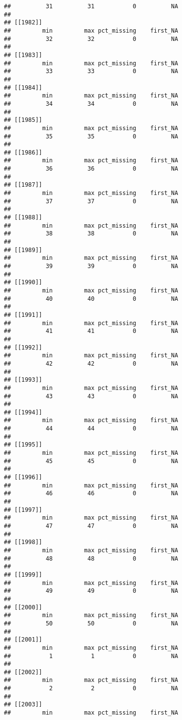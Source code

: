 \documentclass[
]{article}
\begin{document}
\begin{verbatim}
##          31          31           0          NA 
## 
## [[1982]]
##         min         max pct_missing    first_NA 
##          32          32           0          NA 
## 
## [[1983]]
##         min         max pct_missing    first_NA 
##          33          33           0          NA 
## 
## [[1984]]
##         min         max pct_missing    first_NA 
##          34          34           0          NA 
## 
## [[1985]]
##         min         max pct_missing    first_NA 
##          35          35           0          NA 
## 
## [[1986]]
##         min         max pct_missing    first_NA 
##          36          36           0          NA 
## 
## [[1987]]
##         min         max pct_missing    first_NA 
##          37          37           0          NA 
## 
## [[1988]]
##         min         max pct_missing    first_NA 
##          38          38           0          NA 
## 
## [[1989]]
##         min         max pct_missing    first_NA 
##          39          39           0          NA 
## 
## [[1990]]
##         min         max pct_missing    first_NA 
##          40          40           0          NA 
## 
## [[1991]]
##         min         max pct_missing    first_NA 
##          41          41           0          NA 
## 
## [[1992]]
##         min         max pct_missing    first_NA 
##          42          42           0          NA 
## 
## [[1993]]
##         min         max pct_missing    first_NA 
##          43          43           0          NA 
## 
## [[1994]]
##         min         max pct_missing    first_NA 
##          44          44           0          NA 
## 
## [[1995]]
##         min         max pct_missing    first_NA 
##          45          45           0          NA 
## 
## [[1996]]
##         min         max pct_missing    first_NA 
##          46          46           0          NA 
## 
## [[1997]]
##         min         max pct_missing    first_NA 
##          47          47           0          NA 
## 
## [[1998]]
##         min         max pct_missing    first_NA 
##          48          48           0          NA 
## 
## [[1999]]
##         min         max pct_missing    first_NA 
##          49          49           0          NA 
## 
## [[2000]]
##         min         max pct_missing    first_NA 
##          50          50           0          NA 
## 
## [[2001]]
##         min         max pct_missing    first_NA 
##           1           1           0          NA 
## 
## [[2002]]
##         min         max pct_missing    first_NA 
##           2           2           0          NA 
## 
## [[2003]]
##         min         max pct_missing    first_NA 

\end{verbatim}
\end{document}
